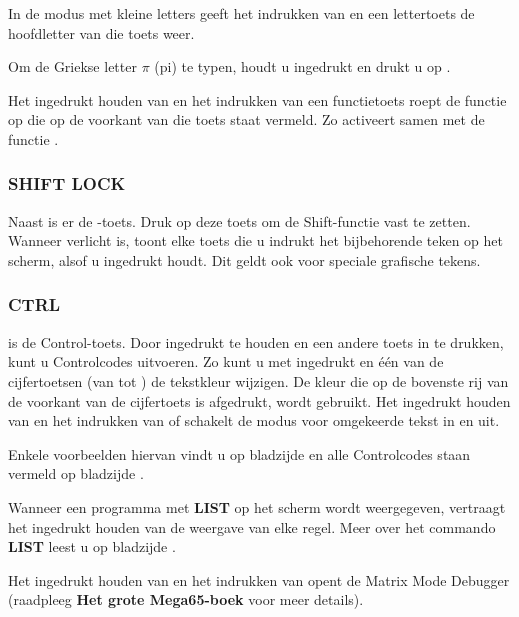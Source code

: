 In de modus met kleine letters geeft het indrukken van  en een lettertoets de hoofdletter van die toets weer.

Om de Griekse letter $\pi$ (pi) te typen, houdt u  ingedrukt en drukt u op \megakeywhite{$\uparrow$}.

Het ingedrukt houden van  en het indrukken van een functietoets roept de functie op die op de voorkant van die toets staat vermeld. Zo activeert  samen met  de functie .


\subsubsection{SHIFT LOCK}
Naast  is er de -toets. Druk op deze toets om de Shift-functie vast te zetten. Wanneer  verlicht is, toont elke toets die u indrukt het bijbehorende teken op het scherm, alsof u  ingedrukt houdt. Dit geldt ook voor speciale grafische tekens.

\subsubsection{CTRL}
 is de Control-toets. Door  ingedrukt te houden en een andere toets in te drukken, kunt u Controlcodes uitvoeren. Zo kunt u met  ingedrukt en één van de cijfertoetsen (van  tot ) de tekstkleur wijzigen. De kleur die op de bovenste rij van de voorkant van de cijfertoets is afgedrukt, wordt gebruikt. Het ingedrukt houden van  en het indrukken van  of  schakelt de modus voor omgekeerde tekst in en uit.

Enkele voorbeelden hiervan vindt u op bladzijde \pageref{sec:screen-editor} en alle Controlcodes staan vermeld op bladzijde \pageref{appendix:controlcodes}.

Wanneer een programma met {\bf LIST} op het scherm wordt weergegeven, vertraagt het ingedrukt houden van  de weergave van elke regel. Meer over het commando {\bf LIST} leest u op bladzijde \pageref{BASIC 65 Commands!LIST}.

Het ingedrukt houden van  en het indrukken van \megakey{*} opent de Matrix Mode Debugger (raadpleeg {\bf Het grote Mega65-boek} voor meer details).

